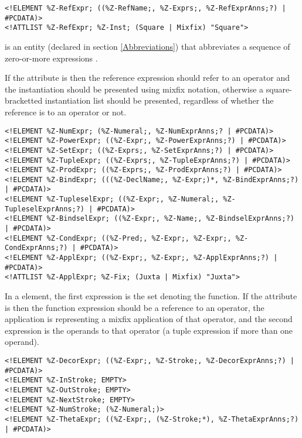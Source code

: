 \documentclass[a4paper,10pt]{article}
\begin{document}
\begin{verbatim}
<!ELEMENT %Z-RefExpr; ((%Z-RefName;, %Z-Exprs;, %Z-RefExprAnns;?) | #PCDATA)>
<!ATTLIST %Z-RefExpr; %Z-Inst; (Square | Mixfix) "Square">
\end{verbatim}

 is an entity (declared in section \ref{Abbreviations})
that abbreviates a sequence of zero-or-more expressions .

If the  attribute is 
then the reference expression should refer to an operator
and the instantiation should be presented using mixfix notation,
otherwise a square-bracketted instantiation list should be presented,
regardless of whether the reference is to an operator or not.

\begin{verbatim}
<!ELEMENT %Z-NumExpr; (%Z-Numeral;, %Z-NumExprAnns;? | #PCDATA)>
<!ELEMENT %Z-PowerExpr; ((%Z-Expr;, %Z-PowerExprAnns;?) | #PCDATA)>
<!ELEMENT %Z-SetExpr; ((%Z-Exprs;, %Z-SetExprAnns;?) | #PCDATA)>
<!ELEMENT %Z-TupleExpr; ((%Z-Exprs;, %Z-TupleExprAnns;?) | #PCDATA)>
<!ELEMENT %Z-ProdExpr; ((%Z-Exprs;, %Z-ProdExprAnns;?) | #PCDATA)>
<!ELEMENT %Z-BindExpr; (((%Z-DeclName;, %Z-Expr;)*, %Z-BindExprAnns;?) | #PCDATA)>
<!ELEMENT %Z-TupleselExpr; ((%Z-Expr;, %Z-Numeral;, %Z-TupleselExprAnns;?) | #PCDATA)>
<!ELEMENT %Z-BindselExpr; ((%Z-Expr;, %Z-Name;, %Z-BindselExprAnns;?) | #PCDATA)>
<!ELEMENT %Z-CondExpr; ((%Z-Pred;, %Z-Expr;, %Z-Expr;, %Z-CondExprAnns;?) | #PCDATA)>
<!ELEMENT %Z-ApplExpr; ((%Z-Expr;, %Z-Expr;, %Z-ApplExprAnns;?) | #PCDATA)>
<!ATTLIST %Z-ApplExpr; %Z-Fix; (Juxta | Mixfix) "Juxta">
\end{verbatim}

In a  element,
the first expression is the set denoting the function.
If the  attribute is 
then the function expression should be a reference to an operator,
the application is representing a mixfix application of that operator,
and the second expression is the operands to that operator
(a tuple expression if more than one operand).

\begin{verbatim}
<!ELEMENT %Z-DecorExpr; ((%Z-Expr;, %Z-Stroke;, %Z-DecorExprAnns;?) | #PCDATA)>
<!ELEMENT %Z-InStroke; EMPTY>
<!ELEMENT %Z-OutStroke; EMPTY>
<!ELEMENT %Z-NextStroke; EMPTY>
<!ELEMENT %Z-NumStroke; (%Z-Numeral;)>
<!ELEMENT %Z-ThetaExpr; ((%Z-Expr;, (%Z-Stroke;*), %Z-ThetaExprAnns;?) | #PCDATA)>
\end{verbatim}
\end{document}
